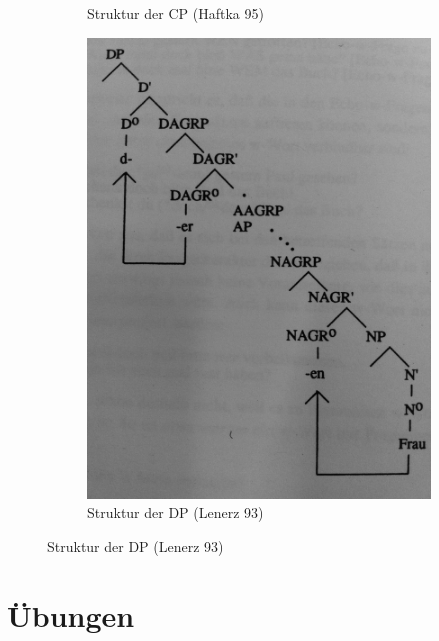 \begin{frame}
\begin{figure}[b]
\begin{minipage}[b]{0.48\textwidth}
\begin{figure}
		\caption{Struktur der CP (Haftka 95)}
	\end{figure}
	\end{minipage}
	\begin{minipage}[b]{0.48\textwidth}
	\begin{figure}
		\includegraphics[scale=0.07]{material/Lenerz93DP}
		\caption{Struktur der DP (Lenerz 93)}
	\end{figure}
	\end{minipage}                        
\end{figure}

\end{frame}


\section{Übungen}


